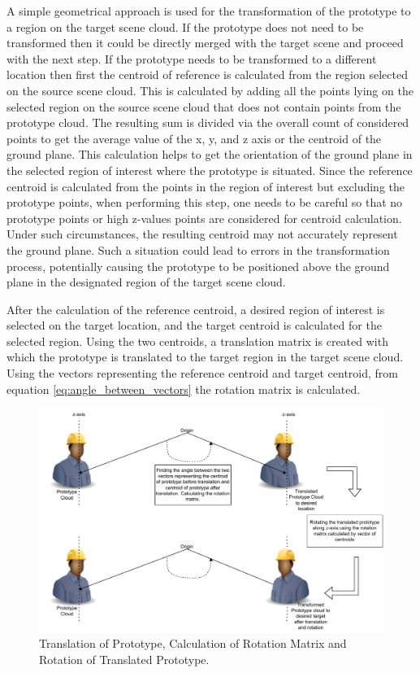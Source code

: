 A simple geometrical approach is used for the transformation of the prototype to a region on the target scene cloud. If the prototype does not need to be transformed then it could be directly merged with the target scene and proceed with the next step. If the prototype needs to be transformed to a different location then first the centroid of reference is calculated from the region selected on the source scene cloud. This is calculated by adding all the points lying on the selected region on the source scene cloud that does not contain points from the prototype cloud. The resulting sum is divided via the overall count of considered points to get the average value of the x, y, and z axis or the centroid of the ground plane. This calculation helps to get the orientation of the ground plane in the selected region of interest where the prototype is situated. Since the reference centroid is calculated from the points in the region of interest but excluding the prototype points, when performing this step, one needs to be careful so that no prototype points or high z-values points are considered for centroid calculation. Under such circumstances, the resulting centroid may not accurately represent the ground plane. Such a situation could lead to errors in the transformation process, potentially causing the prototype to be positioned above the ground plane in the designated region of the target scene cloud.

After the calculation of the reference centroid, a desired region of interest is selected on the target location, and the target centroid is calculated for the selected region. Using the two centroids, a translation matrix is created with which the prototype is translated to the target region in the target scene cloud. Using the vectors representing the reference centroid and target centroid, from equation \ref{eq:angle_between_vectors} the rotation matrix is calculated.

\begin{figure}[htb]
    \centering
    \includegraphics[width=0.8\linewidth]{97_graphics/concepts/rotational_matrix_calculation.pdf}
    \caption{Translation of Prototype, Calculation of Rotation Matrix and Rotation of Translated Prototype.}
    \label{fig:rotation_matrix_calculation}
\end{figure}

